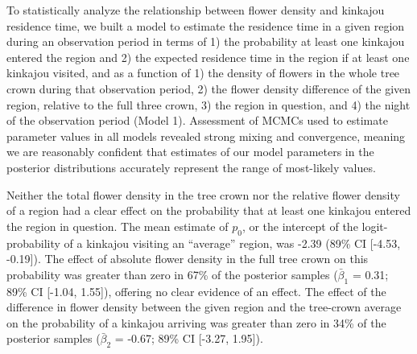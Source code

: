 \documentclass[twoside,12pt,final]{ucthesis-CA2012}
\begin{document}
\begin{ucmainmatter}
To statistically analyze the relationship between flower density and kinkajou residence time, we built a model to estimate the residence time in a given region during an observation period in terms of 1) the probability at least one kinkajou entered the region and 2) the expected residence time in the region if at least one kinkajou visited, and as a function of 1) the density of flowers in the whole tree crown during that observation period, 2) the flower density difference of the given region, relative to the full three crown, 3) the region in question, and 4) the night of the observation period (Model 1). Assessment of MCMCs used to estimate parameter values in all models revealed strong mixing and convergence, meaning we are reasonably confident that estimates of our model parameters in the posterior distributions accurately represent the range of most-likely values.

Neither the total flower density in the tree crown nor the relative flower density of a region had a clear effect on the probability that at least one kinkajou entered the region in question. The mean estimate of \(p_0\), or the intercept of the logit-probability of a kinkajou visiting an ``average'' region, was -2.39 (89\% CI {[}-4.53, -0.19{]}). The effect of absolute flower density in the full tree crown on this probability was greater than zero in 67\% of the posterior samples (\(\bar\beta_1\) = 0.31; 89\% CI {[}-1.04, 1.55{]}), offering no clear evidence of an effect. The effect of the difference in flower density between the given region and the tree-crown average on the probability of a kinkajou arriving was greater than zero in 34\% of the posterior samples (\(\bar\beta_2\) = -0.67; 89\% CI {[}-3.27, 1.95{]}).


\end{ucmainmatter}
\end{document}
